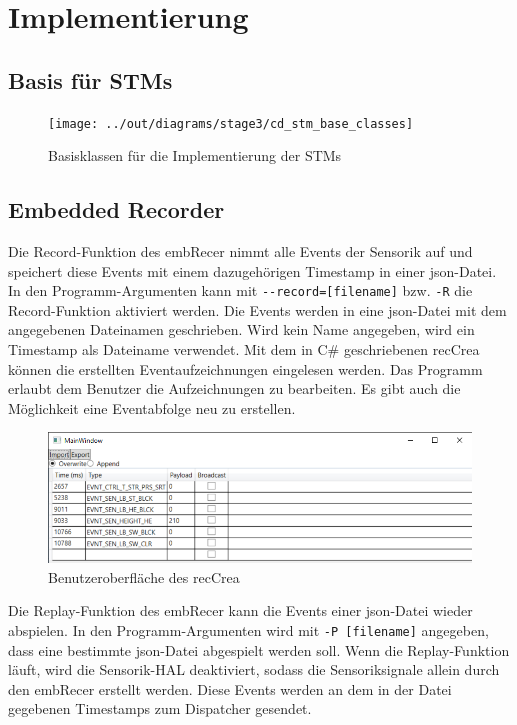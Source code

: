 \chapter{Implementierung}\label{ch:implementierung}




\section{Basis für STMs}\label{sec:basis-fuer-stms}

\begin{figure}[h]
    \centering
    \texttt{[image: ../out/diagrams/stage3/cd\_stm\_base\_classes]}
    \caption{Basisklassen für die Implementierung der STMs}
    \label{fig:cd-stm-base}
\end{figure}



\section{Embedded Recorder}\label{sec:embedded-recorder}

Die Record-Funktion des \gls{embRecer} nimmt alle Events der Sensorik auf und
speichert diese Events mit einem dazugehörigen Timestamp in einer json-Datei.
In den Programm-Argumenten kann mit \verb|--record=[filename]| bzw.
\verb|-R| die Record-Funktion aktiviert werden.
Die Events werden in eine json-Datei mit dem angegebenen Dateinamen geschrieben.
Wird kein Name angegeben, wird ein Timestamp als Dateiname verwendet.
Mit dem in C\# geschriebenen \gls{recCrea} können die erstellten
Eventaufzeichnungen eingelesen werden.
Das Programm erlaubt dem Benutzer die Aufzeichnungen zu bearbeiten.
Es gibt auch die Möglichkeit eine Eventabfolge neu zu erstellen.
\begin{figure}[h]
    \centering
    \includegraphics[scale = 0.7]{anhang/EmbeddedRecordCreator.PNG}
    \caption{Benutzeroberfläche des \gls{recCrea}}
    \label{fig:embedded-record-creator}
\end{figure}

\FloatBarrier
\noindent Die Replay-Funktion des \gls{embRecer} kann die Events einer json-Datei wieder
abspielen.
In den Programm-Argumenten wird mit \verb|-P [filename]| angegeben, dass eine bestimmte json-Datei
abgespielt werden soll.
Wenn die Replay-Funktion läuft, wird die Sensorik-HAL deaktiviert,
sodass die Sensoriksignale allein durch den \gls{embRecer} erstellt werden.
Diese Events werden an dem in der Datei gegebenen Timestamps zum Dispatcher gesendet.
